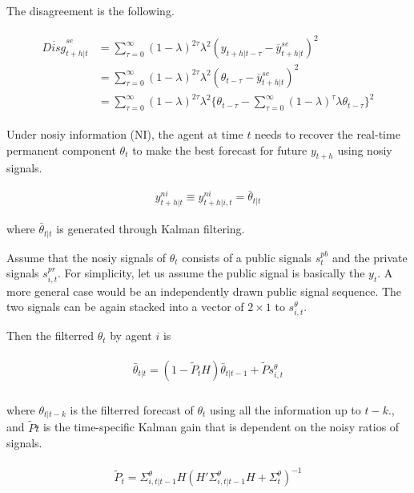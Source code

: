 \documentclass[12pt]{article}
\begin{document}
	The disagreement is the following. 
	
	
	\begin{eqnarray}
	\begin{split}
	\overline{Disg}^{se}_{t+h|t} & =  \sum^{\infty}_{\tau=0} (1-\lambda)^{2\tau} \lambda^2 (y_{t+h|t-\tau} - \overline y^{se}_{t+h|t})^2  \\
	& = \sum^{\infty}_{\tau=0} (1-\lambda)^{2\tau} \lambda^2 (\theta_{t-\tau} - \overline y^{se}_{t+h|t})^2  \\
	& = \sum^{\infty}_{\tau=0} (1-\lambda)^{2\tau} \lambda^2 \{\theta_{t-\tau} - \sum^{\infty}_{\tau=0} (1-\lambda)^\tau\lambda \theta_{t-\tau}\}^2  
	\end{split} 
	\end{eqnarray}
	
	
	Under nosiy information (NI), the agent at time $t$ needs to recover the real-time permanent component $\theta_t$ to make the best forecast for future $y_{t+h}$ using nosiy signals.   
	
	
	\begin{eqnarray}
	y^{ni}_{t+h|t}  \equiv  y^{ni}_{t+h|i,t} = \bar \theta_{t|t}
	\end{eqnarray}
	
	where $\bar \theta_{t|t}$ is generated through Kalman filtering.  
	
	Assume that the nosiy signals of $\theta_t$ consists of a public signals $s^{pb}_{t}$ and the private signals $s^{pr}_{i,t}$. For simplicity, let us assume the public signal is basically the $y_t$. A more general case would be an independently drawn public signal sequence. The two signals can be again stacked into a vector of $2\times 1$ to $s^\theta_{i,t}$. 
	
	Then the filterred $\theta_{t}$ by agent $i$ is 
	
	\begin{eqnarray}
	\begin{split}
	\bar \theta_{t|t} =  (1-\tilde P_{t} H) \bar \theta_{t|t-1} + \tilde P s^\theta_{i,t} \\
	\end{split}
	\end{eqnarray}
	
	where $\theta_{t|t-k}$ is the filterred forecast of $\theta_t$ using all the information up to $t-k$., and $\tilde Pt$ is the time-specific Kalman gain that is dependent on the noisy ratios of signals. 
	
	\begin{eqnarray}
	\begin{split}
	\tilde P_{t} =  \Sigma^\theta_{i,t|t-1} H(H'\Sigma^\theta_{i,t|t-1} H + \Sigma^\theta_{t})^{-1} 
	\end{split}
	\end{eqnarray}
	
\end{document}
